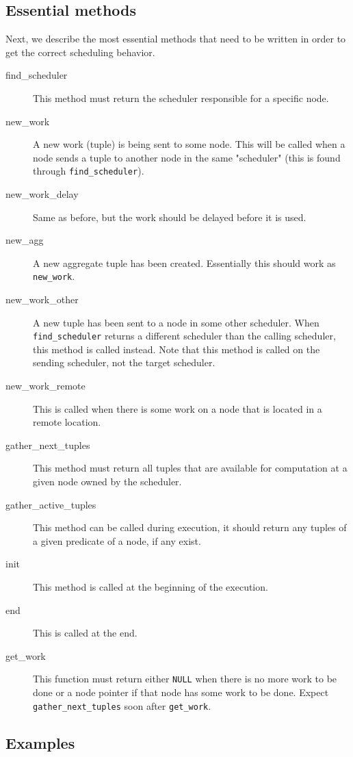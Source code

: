 \documentclass[11pt]{article}
\begin{document}
\subsection{Essential methods}

Next, we describe the most essential methods that need to be written in order to get the correct scheduling behavior.

\begin{description}
\item[find\_scheduler] This method must return the scheduler responsible for a specific node.
\item[new\_work] A new work (tuple) is being sent to some node. This will be called when a node sends a tuple to another node in the same "scheduler" (this is found through \texttt{find\_scheduler}).
\item[new\_work\_delay] Same as before, but the work should be delayed before it is used.
\item[new\_agg] A new aggregate tuple has been created. Essentially this should work as \texttt{new\_work}.
\item[new\_work\_other] A new tuple has been sent to a node in some other scheduler. When \texttt{find\_scheduler} returns a different scheduler than the calling scheduler, this method is called instead. Note that this method is called on the sending scheduler, not the target scheduler.
\item[new\_work\_remote] This is called when there is some work on a node that is located in a remote location.
\item[gather\_next\_tuples] This method must return all tuples that are available for computation at a given node owned by the scheduler.
\item[gather\_active\_tuples] This method can be called during execution, it should return any tuples of a given predicate of a node, if any exist.
\item[init] This method is called at the beginning of the execution.
\item[end] This is called at the end.
\item[get\_work] This function must return either \texttt{NULL} when there is no more work to be done or a node pointer if that node has some work to be done. Expect \texttt{gather\_next\_tuples} soon after \texttt{get\_work}. 
\end{description}

\subsection{Examples}
\end{document}
